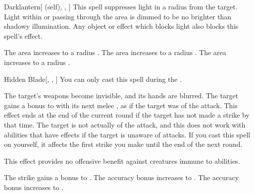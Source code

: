 \lowercase{\hypertarget{spell:Darklantern}{}}\label{spell:Darklantern}
\begin{attuneability}[Rank 1]{\hypertarget{spell:Darklantern}{Darklantern}}[ (self), , ]
This spell suppresses light in a \areamed radius  from the target.
Light within or passing through the area is dimmed to be no brighter than shadowy illumination.
Any object or effect which blocks light also blocks this spell's effect.

\rankline
{} The area increases to a \arealarge radius .
 The area increases to a \areahuge radius .
 The area increases to a \areaext radius .
\end{attuneability}
\vspace{0.25em}



\lowercase{\hypertarget{spell:Hidden Blade}{}}\label{spell:Hidden Blade}
\begin{freeability}[Rank 1]{\hypertarget{spell:Hidden Blade}{Hidden Blade}}[, , ]
You can only cast this spell during the .

The target's weapons become invisible, and its hands are blurred.
The target gains a  bonus to  with its next melee ,
as if the target was  of the attack.
This effect ends at the end of the current round if the target has not made a strike by that time.
The target is not actually  of the attack, and this does not work with abilities that have effects if the target is unaware of attacks.
If you cast this spell on yourself, it affects the first strike you make until the end of the next round.

This effect provides no offensive benefit against creatures immune to  abilities.

\rankline
{} The strike gains a  bonus to .
 The accuracy bonus increases to .
 The accuracy bonus increases to .
\end{freeability}
\vspace{0.25em}



